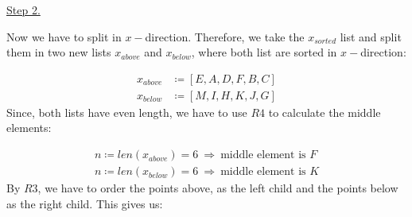 \documentclass[english, fontsize=12pt, paper=a4, twoside=false, draft=true, pagesize=auto, version=last, DIV=16]{scrartcl}
\theoremstyle{break}
\begin{document}
\underline{Step 2.} \par
Now we have to split in $x-$direction. Therefore, we take the $x_{sorted}$ list and split them in two new lists $x_{above}$ and $x_{below}$, where both list are sorted in $x-$direction: \par
\vspace*{-3mm}
\begin{equation}
\begin{aligned}
x_{above} & \coloneqq [E,A,D,F,B,C] \\[3pt]
x_{below} & \coloneqq [M,I,H,K,J,G]
\end{aligned}
\end{equation}
Since, both lists have even length, we have to use $R4$ to calculate the middle elements: \par\vspace*{-3mm}
\begin{equation}
\begin{aligned}
n \coloneqq len(x_{above}) = 6 \ \Longrightarrow \ \text{middle element is } F \\[3pt]
n \coloneqq len(x_{below}) = 6 \ \Longrightarrow \ \text{middle element is } K
\end{aligned}
\end{equation}
By $R3$, we have to order the points above, as the left child and the points below as the right child. This gives us: \newpage
\end{document}
